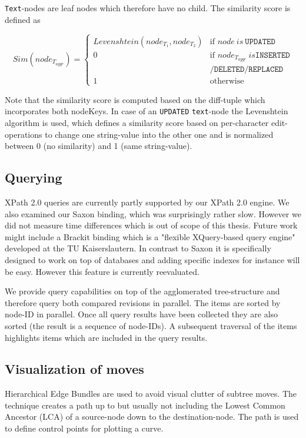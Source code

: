\texttt{Text}-nodes are leaf nodes which therefore have no child. The similarity score is defined as

\begin{equation}
Sim(node_{T_{aggr}}) = \left\{ \begin{array}{cl}
Levenshtein(node_{T_{1}}, node_{T_{2}}) & \textrm{if }node\ is\ \texttt{UPDATED}\\
0 & \textrm{if }node_{T_{aggr}}\ is \texttt{INSERTED}\\
  & \texttt{/DELETED/REPLACED}\\
1 & \textrm{otherwise}\end{array}\right.
\end{equation}

Note that the similarity score is computed based on the diff-tuple which incorporates both nodeKeys. In case of an \texttt{UPDATED} \texttt{text}-node the Levenshtein algorithm is used, which defines a similarity score based on per-character edit-operations to change one string-value into the other one and is normalized between 0 (no similarity) and 1 (same string-value). 

\subsection{Querying}
XPath 2.0 queries are currently partly supported by our XPath 2.0 engine. We also examined our Saxon binding, which was surprisingly rather slow. However we did not measure time differences which is out of scope of this thesis. Future work might include a Brackit\cite{Brackit} binding which is a "flexible XQuery-based query engine" developed at the TU Kaiserslautern. In contrast to Saxon it is specifically designed to work on top of databases and adding specific indexes for instance will be easy. However this feature is currently reevaluated.

We provide query capabilities on top of the agglomerated tree-structure and therefore query both compared revisions in parallel. The items are sorted by node-ID in parallel. Once all query results have been collected they are also sorted (the result is a sequence of node-IDs). A subsequent traversal of the items highlights items which are included in the query results.

\subsection{Visualization of moves}
Hierarchical Edge Bundles\cite{Bundles} are used to avoid visual clutter of subtree moves. The technique creates a path up to but usually not including the Lowest Common Ancestor (LCA) of a source-node down to the destination-node. The path is used to define control points for plotting a curve.

